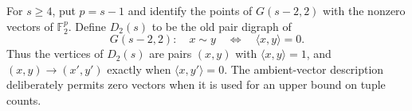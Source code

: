 \begin{definition}
For $s\geq4$, put $p=s-1$ and identify the points of
$G(s-2,2)$ with the nonzero vectors of $\mathbb F_2^p$.  Define
$D_2(s)$ to be the old pair digraph of
\[
 G(s-2,2):\quad x\sim y\quad\Longleftrightarrow\quad
 \langle x,y\rangle=0.
\]
Thus the vertices of $D_2(s)$ are pairs $(x,y)$ with
$\langle x,y\rangle=1$, and
$(x,y)\to(x',y')$ exactly when $\langle x,y'\rangle=0$.
The ambient-vector description deliberately permits zero vectors when it is
used for an upper bound on tuple counts.
\end{definition}
